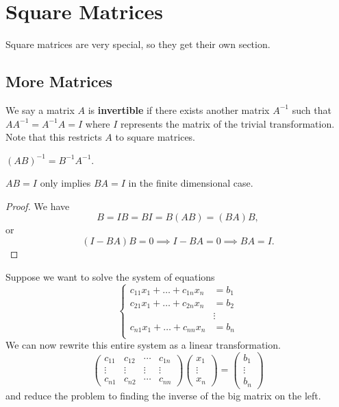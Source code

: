 \section{Square Matrices}
Square matrices are very special, so they get their own section.

\subsection{More Matrices}
\begin{df}
We say a matrix $A$ is \textbf{invertible} if there exists another
matrix $A^{-1}$ such that $A A^{-1} = A^{-1} A = I$ where $I$ represents
the matrix of the trivial transformation. Note that this restricts $A$
to square matrices.
\end{df}

\begin{rem}
$(AB)^{-1} = B^{-1} A^{-1}$.
\end{rem}

\begin{prop}
$AB = I$ only implies $BA = I$ in the finite dimensional case.
\end{prop}

\begin{proof}
We have
\[ B = IB = BI = B(AB) = (BA)B, \]
or
\[ (I - BA)B = 0 \implies I - BA = 0 \implies BA = I. \]
\end{proof}

\begin{rem}
Suppose we want to solve the system of equations
\[ \left\lbrace\begin{aligned}
c_{11} x_1 + \dots + c_{1n} x_n &= b_1 \\
c_{21} x_1 + \dots + c_{2n} x_n &= b_2 \\
& \vdots \\
c_{n1} x_1 + \dots + c_{nn} x_n &= b_n \\
\end{aligned} \right. \]
We can now rewrite this entire system as a linear transformation.
\[ \begin{pmatrix}
c_{11} & c_{12} & \cdots & c_{1n} \\
\vdots & \vdots & \vdots & \vdots \\
c_{n1} & c_{n2} & \cdots & c_{nn}
\end{pmatrix} \begin{pmatrix}
x_1 \\ \vdots \\ x_n
\end{pmatrix} = \begin{pmatrix}
b_1 \\ \vdots \\ b_n
\end{pmatrix} \]
and reduce the problem to finding the inverse of the big matrix on the
left.
\end{rem}

